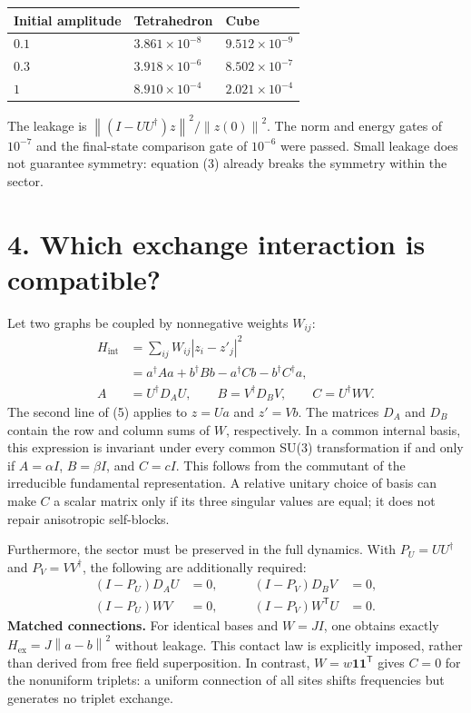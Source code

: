 \documentclass[a4paper,11pt]{article}
\newcommand{\norm}[1]{\left\lVert#1\right\rVert}
\newenvironment{drafttable}{\begin{center}\small\renewcommand{\arraystretch}{1.2}}{\end{center}}
\begin{document}
\begin{drafttable}
\begin{tabular}{@{}lll@{}}\toprule
Initial amplitude & Tetrahedron & Cube\\\midrule
$0.1$ & $3.861\times10^{-8}$ & $9.512\times10^{-9}$\\
$0.3$ & $3.918\times10^{-6}$ & $8.502\times10^{-7}$\\
$1$ & $8.910\times10^{-4}$ & $2.021\times10^{-4}$\\\bottomrule
\end{tabular}
\end{drafttable}
The leakage is $\norm{(I-UU^\dagger)z}^2/\norm{z(0)}^2$. The norm and energy gates of $10^{-7}$ and the final-state comparison gate of $10^{-6}$ were passed. Small leakage does not guarantee symmetry: equation (3) already breaks the symmetry within the sector.

\section*{4. Which exchange interaction is compatible?}
Let two graphs be coupled by nonnegative weights $W_{ij}$:
\begin{equation}
\begin{aligned}
H_{\mathrm{int}}&=\sum_{ij}W_{ij}|z_i-z'_j|^2\\
&=a^\dagger Aa+b^\dagger Bb-a^\dagger Cb-b^\dagger C^\dagger a,\\
A&=U^\dagger D_AU,\qquad B=V^\dagger D_BV,\qquad C=U^\dagger WV.
\end{aligned}\tag{5}
\end{equation}
The second line of (5) applies to $z=Ua$ and $z'=Vb$. The matrices $D_A$ and $D_B$ contain the row and column sums of $W$, respectively. In a common internal basis, this expression is invariant under every common SU(3) transformation if and only if $A=\alpha I$, $B=\beta I$, and $C=cI$. This follows from the commutant of the irreducible fundamental representation. A relative unitary choice of basis can make $C$ a scalar matrix only if its three singular values are equal; it does not repair anisotropic self-blocks.

Furthermore, the sector must be preserved in the full dynamics. With $P_U=UU^\dagger$ and $P_V=VV^\dagger$, the following are additionally required:
\begin{equation}
\begin{aligned}
(I-P_U)D_AU&=0,\qquad &(I-P_V)D_BV&=0,\\
(I-P_U)WV&=0, &(I-P_V)W^{\mathsf T}U&=0.
\end{aligned}\tag{6}
\end{equation}
\textbf{Matched connections.} For identical bases and $W=JI$, one obtains exactly $H_{\mathrm{ex}}=J\norm{a-b}^2$ without leakage. This contact law is explicitly imposed, rather than derived from free field superposition. In contrast, $W=w\mathbf1\mathbf1^{\mathsf T}$ gives $C=0$ for the nonuniform triplets: a uniform connection of all sites shifts frequencies but generates no triplet exchange.
\end{document}
